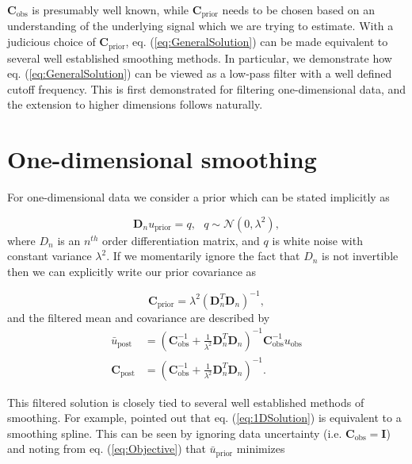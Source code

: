 \documentclass[10pt,a4paper]{article}
\begin{document}
$\mathbf{C}_\mathrm{obs}$ is presumably well known, while $\mathbf{C}_\mathrm{prior}$ needs to be chosen based on an understanding of the underlying signal which we are trying to estimate.  With a judicious choice of $\mathbf{C}_\mathrm{prior}$,  eq. (\ref{eq:GeneralSolution}) can be made equivalent to several well established smoothing methods.  In particular, we demonstrate how eq. (\ref{eq:GeneralSolution}) can be viewed as a low-pass filter with a well defined cutoff frequency. This is first demonstrated for filtering one-dimensional data, and the extension to higher dimensions follows naturally.  

\section*{One-dimensional smoothing}
For one-dimensional data we consider a prior which can be stated implicitly as

\begin{equation}\label{eq:ImplicitPrior1D}
  \mathbf{D}_{n} u_\mathrm{prior} = q, \ \ \ q \sim \mathcal{N}(0,\lambda^2),
\end{equation}  
where $D_n$ is an $n^{th}$ order differentiation matrix, and $q$ is white noise with constant variance $\lambda^2$.  If we momentarily ignore the fact that $D_n$ is not invertible then we can explicitly write our prior covariance as

\begin{equation}\label{eq:ExplicitPrior1D}
\mathbf{C_\mathrm{prior}} = \lambda^2(\mathbf{D}_n^T\mathbf{D}_n)^{-1},
\end{equation}
and the filtered mean and covariance are described by
\begin{equation}\label{eq:1DSolution}
\begin{split}
\bar{u}_\mathrm{post} &= (\mathbf{C}_\mathrm{obs}^{-1} +   
                   \frac{1}{\lambda^2}\mathbf{D}_n^T\mathbf{D}_n)^{-1}\mathbf{C}_\mathrm{obs}^{-1}
                   u_\mathrm{obs}
\\
\mathbf{C}_\mathrm{post} &= (\mathbf{C}_\mathrm{obs}^{-1} +   
                            \frac{1}{\lambda^2}\mathbf{D}_n^T\mathbf{D}_n)^{-1}.
\end{split}
\end{equation}

This filtered solution is closely tied to several well established methods of smoothing.  For example, \citet{Kimeldorf1970} pointed out that eq. (\ref{eq:1DSolution}) is equivalent to a smoothing spline.  This can be seen by ignoring data uncertainty (i.e. $\mathbf{C}_\mathrm{obs}=\mathbf{I}$) and noting from eq. (\ref{eq:Objective}) that $\bar{u}_\mathrm{prior}$ minimizes 
\end{document}
